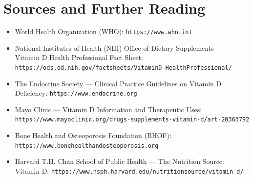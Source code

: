 \section*{Sources and Further Reading}
\begin{itemize}
    \item World Health Organization (WHO): \texttt{https://www.who.int}
    \item National Institutes of Health (NIH) Office of Dietary Supplements --- Vitamin D Health Professional Fact Sheet: \texttt{https://ods.od.nih.gov/factsheets/VitaminD-HealthProfessional/}
    \item The Endocrine Society --- Clinical Practice Guidelines on Vitamin D Deficiency: \texttt{https://www.endocrine.org}
    \item Mayo Clinic --- Vitamin D Information and Therapeutic Uses: \texttt{https://www.mayoclinic.org/drugs-supplements-vitamin-d/art-20363792}
    \item Bone Health and Osteoporosis Foundation (BHOF): \texttt{https://www.bonehealthandosteoporosis.org}
    \item Harvard T.H. Chan School of Public Health --- The Nutrition Source: Vitamin D: \texttt{https://www.hsph.harvard.edu/nutritionsource/vitamin-d/}
\end{itemize}
